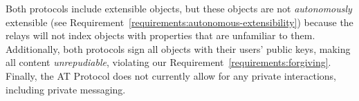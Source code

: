 
Both protocols include extensible objects, but these objects are not
\emph{autonomously} extensible (see Requirement~\ref{requirements:autonomous-extensibility})
because the relays will not index objects with properties that are unfamiliar to them.
Additionally, both protocols sign all objects with their users' public keys, making
all content \emph{unrepudiable}, violating our Requirement~\ref{requirements:forgiving}.
Finally, the AT Protocol does not currently allow for
any private interactions, including private messaging.







